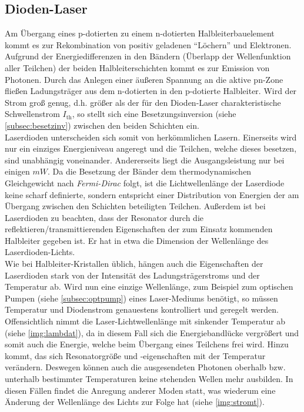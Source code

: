 \documentclass[numbers=noenddot,12pt,a4paper]{scrartcl}
\newcommand{\ix}[1]{_\text{#1}}
\newcommand{\tilt}[1]{\mbox{\textit{#1}}}
\begin{document}
\subsection{Dioden-Laser}\label{subsec:dlaser}
Am Übergang eines p-dotierten zu einem n-dotierten Halbleiterbauelement kommt es zur Rekombination von positiv geladenen "`Löchern"' und Elektronen. Aufgrund der Energiedifferenzen in den Bändern (Überlapp der Wellenfunktion aller Teilchen) der beiden Halbleiterschichten kommt es zur Emission von Photonen. Durch das Anlegen einer äußeren Spannung an die aktive pn-Zone fließen Ladungsträger aus dem n-dotierten in den p-dotierte Halbleiter. Wird der Strom groß genug, d.h. größer als der für den Dioden-Laser charakteristische Schwellenstrom $I\ix{th}$, so stellt sich eine Besetzungsinversion (siehe \ref{subsec:besetzinv}) zwischen den beiden Schichten ein.
\\Laserdioden unterscheiden sich somit von herkömmlichen Lasern. Einerseits wird nur ein einziges Energieniveau angeregt und die Teilchen, welche dieses besetzen, sind unabhängig voneinander. Andererseits liegt die Ausgangsleistung nur bei einigen $\unit{mW}$. Da die Besetzung der Bänder dem thermodynamischen Gleichgewicht nach \tilt{Fermi-Dirac} folgt, ist die Lichtwellenlänge der Laserdiode keine scharf definierte, sondern entspricht einer Distribution von Energien der am Übergang zwischen den Schichten beteiligten Teilchen. Außerdem ist bei Laserdioden zu beachten, dass der Resonator durch die reflektieren/transmittierenden Eigenschaften der zum Einsatz kommenden Halbleiter gegeben ist. Er hat in etwa die Dimension der Wellenlänge des \mbox{Laserdioden-Lichts}.\\Wie bei Halbleiter-Kristallen üblich, hängen auch die Eigenschaften der Laserdioden stark von der Intensität des Ladungsträgerstroms und der Temperatur ab. Wird nun eine einzige Wellenlänge, zum Beispiel zum optischen Pumpen (siehe \ref{subsec:optpump}) eines Laser-Mediums benötigt, so müssen Temperatur und Diodenstrom genauestens kontrolliert und geregelt werden. Offensichtlich nimmt die Laser-Lichtwellenlänge mit sinkender Temperatur ab (siehe \ref{img:lambdat}), da in diesem Fall sich die Energiebandlücke vergrößert und somit auch die Energie, welche beim Übergang eines Teilchens frei wird. Hinzu kommt, das sich Resonatorgröße und -eigenschaften mit der Temperatur verändern. Deswegen können auch die ausgesendeten Photonen oberhalb bzw. unterhalb bestimmter Temperaturen keine stehenden Wellen mehr ausbilden. In diesen Fällen findet die Anregung anderer Moden statt, was wiederum eine Änderung der Wellenlänge des Lichts zur Folge hat (siehe \ref{img:stromt}).
\end{document}
